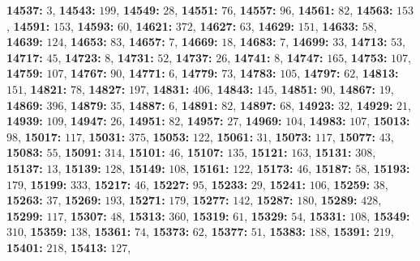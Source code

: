 \textsf{\bfseries 14537:} $3$, \textsf{\bfseries 14543:} $199$, \textsf{\bfseries 14549:} $28$, \textsf{\bfseries 14551:} $76$, \textsf{\bfseries 14557:} $96$, \textsf{\bfseries 14561:} $82$, \textsf{\bfseries 14563:} $153$, \textsf{\bfseries 14591:} $153$, \textsf{\bfseries 14593:} $60$, \textsf{\bfseries 14621:} $372$, \textsf{\bfseries 14627:} $63$, \textsf{\bfseries 14629:} $151$, \textsf{\bfseries 14633:} $58$, \textsf{\bfseries 14639:} $124$, \textsf{\bfseries 14653:} $83$, \textsf{\bfseries 14657:} $7$, \textsf{\bfseries 14669:} $18$, \textsf{\bfseries 14683:} $7$, \textsf{\bfseries 14699:} $33$, \textsf{\bfseries 14713:} $53$, \textsf{\bfseries 14717:} $45$, \textsf{\bfseries 14723:} $8$, \textsf{\bfseries 14731:} $52$, \textsf{\bfseries 14737:} $26$, \textsf{\bfseries 14741:} $8$, \textsf{\bfseries 14747:} $165$, \textsf{\bfseries 14753:} $107$, \textsf{\bfseries 14759:} $107$, \textsf{\bfseries 14767:} $90$, \textsf{\bfseries 14771:} $6$, \textsf{\bfseries 14779:} $73$, \textsf{\bfseries 14783:} $105$, \textsf{\bfseries 14797:} $62$, \textsf{\bfseries 14813:} $151$, \textsf{\bfseries 14821:} $78$, \textsf{\bfseries 14827:} $197$, \textsf{\bfseries 14831:} $406$, \textsf{\bfseries 14843:} $145$, \textsf{\bfseries 14851:} $90$, \textsf{\bfseries 14867:} $19$, \textsf{\bfseries 14869:} $396$, \textsf{\bfseries 14879:} $35$, \textsf{\bfseries 14887:} $6$, \textsf{\bfseries 14891:} $82$, \textsf{\bfseries 14897:} $68$, \textsf{\bfseries 14923:} $32$, \textsf{\bfseries 14929:} $21$, \textsf{\bfseries 14939:} $109$, \textsf{\bfseries 14947:} $26$, \textsf{\bfseries 14951:} $82$, \textsf{\bfseries 14957:} $27$, \textsf{\bfseries 14969:} $104$, \textsf{\bfseries 14983:} $107$, \textsf{\bfseries 15013:} $98$, \textsf{\bfseries 15017:} $117$, \textsf{\bfseries 15031:} $375$, \textsf{\bfseries 15053:} $122$, \textsf{\bfseries 15061:} $31$, \textsf{\bfseries 15073:} $117$, \textsf{\bfseries 15077:} $43$, \textsf{\bfseries 15083:} $55$, \textsf{\bfseries 15091:} $314$, \textsf{\bfseries 15101:} $46$, \textsf{\bfseries 15107:} $135$, \textsf{\bfseries 15121:} $163$, \textsf{\bfseries 15131:} $308$, \textsf{\bfseries 15137:} $13$, \textsf{\bfseries 15139:} $128$, \textsf{\bfseries 15149:} $108$, \textsf{\bfseries 15161:} $122$, \textsf{\bfseries 15173:} $46$, \textsf{\bfseries 15187:} $58$, \textsf{\bfseries 15193:} $179$, \textsf{\bfseries 15199:} $333$, \textsf{\bfseries 15217:} $46$, \textsf{\bfseries 15227:} $95$, \textsf{\bfseries 15233:} $29$, \textsf{\bfseries 15241:} $106$, \textsf{\bfseries 15259:} $38$, \textsf{\bfseries 15263:} $37$, \textsf{\bfseries 15269:} $193$, \textsf{\bfseries 15271:} $179$, \textsf{\bfseries 15277:} $142$, \textsf{\bfseries 15287:} $180$, \textsf{\bfseries 15289:} $428$, \textsf{\bfseries 15299:} $117$, \textsf{\bfseries 15307:} $48$, \textsf{\bfseries 15313:} $360$, \textsf{\bfseries 15319:} $61$, \textsf{\bfseries 15329:} $54$, \textsf{\bfseries 15331:} $108$, \textsf{\bfseries 15349:} $310$, \textsf{\bfseries 15359:} $138$, \textsf{\bfseries 15361:} $74$, \textsf{\bfseries 15373:} $62$, \textsf{\bfseries 15377:} $51$, \textsf{\bfseries 15383:} $188$, \textsf{\bfseries 15391:} $219$, \textsf{\bfseries 15401:} $218$, \textsf{\bfseries 15413:} $127$, 
